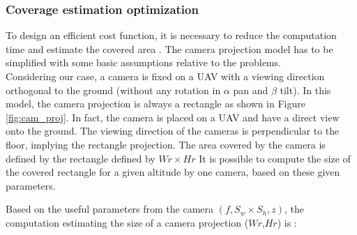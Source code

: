 \subsubsection{Coverage estimation optimization} \label{sec:coverageEstimation}
To design an efficient cost function, it is necessary to reduce the  computation time and estimate the covered area . %
  The camera projection model has to be simplified with some basic assumptions relative to the problems.\\
Considering our case, a camera is fixed on a UAV with a viewing direction orthogonal to the ground (without any rotation in $\alpha$ pan and $\beta$ tilt). 
In this model, the camera projection is always a rectangle as shown in Figure \ref{fig:cam_proj}. In fact, the camera is  placed on a UAV and have a direct view onto the ground. The viewing direction of the cameras is  perpendicular to the floor, implying the rectangle projection.
The area covered  by the camera is defined by the rectangle defined by $Wr\times Hr$ 
It is possible to compute the size of the covered rectangle for a given altitude by one camera, based on these given parameters. 

Based on the useful parameters from the camera $(f ,S_w\times S_h ,z)$, the computation estimating the size of a camera projection ($Wr$,$Hr$) is :

%

	
